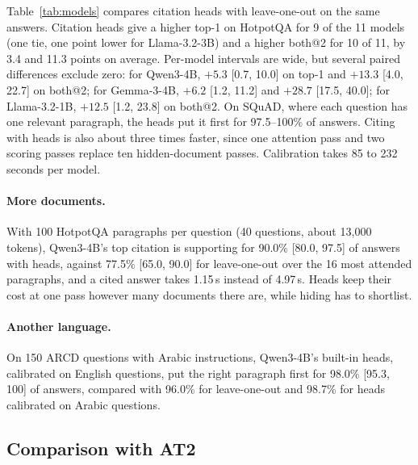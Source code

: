 \documentclass[11pt]{article}
\begin{document}
Table~\ref{tab:models} compares citation heads with leave-one-out on the same answers. Citation heads give a higher top-1 on HotpotQA for 9 of the 11 models (one tie, one point lower for Llama-3.2-3B) and a higher both@2 for 10 of 11, by 3.4 and 11.3 points on average. Per-model intervals are wide, but several paired differences exclude zero: for Qwen3-4B, $+5.3$ [0.7, 10.0] on top-1 and $+13.3$ [4.0, 22.7] on both@2; for Gemma-3-4B, $+6.2$ [1.2, 11.2] and $+28.7$ [17.5, 40.0]; for Llama-3.2-1B, $+12.5$ [1.2, 23.8] on both@2. On SQuAD, where each question has one relevant paragraph, the heads put it first for 97.5--100\% of answers. Citing with heads is also about three times faster, since one attention pass and two scoring passes replace ten hidden-document passes. Calibration takes 85 to 232 seconds per model.

\paragraph{More documents.} With 100 HotpotQA paragraphs per question (40 questions, about 13{,}000 tokens), Qwen3-4B's top citation is supporting for 90.0\% [80.0, 97.5] of answers with heads, against 77.5\% [65.0, 90.0] for leave-one-out over the 16 most attended paragraphs, and a cited answer takes 1.15\,s instead of 4.97\,s. Heads keep their cost at one pass however many documents there are, while hiding has to shortlist.

\paragraph{Another language.} On 150 ARCD questions with Arabic instructions, Qwen3-4B's built-in heads, calibrated on English questions, put the right paragraph first for 98.0\% [95.3, 100] of answers, compared with 96.0\% for leave-one-out and 98.7\% for heads calibrated on Arabic questions.

\subsection{Comparison with AT2}
\label{sec:at2}
\end{document}
